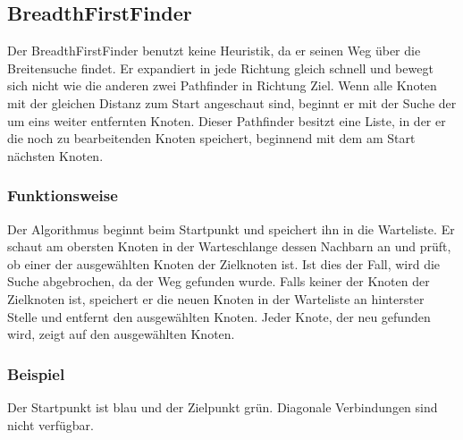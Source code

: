 \subsection{BreadthFirstFinder}

Der BreadthFirstFinder benutzt keine Heuristik, da er seinen Weg über die
Breitensuche findet. Er expandiert in jede Richtung gleich schnell und
bewegt sich nicht wie die anderen zwei Pathfinder in Richtung Ziel. Wenn
alle Knoten mit der gleichen Distanz zum Start angeschaut sind, beginnt
er mit der Suche der um eins weiter entfernten Knoten. Dieser Pathfinder
besitzt eine Liste, in der er die noch zu bearbeitenden Knoten speichert,
beginnend mit dem am Start nächsten Knoten.
\cite[Brilliant.org]{brilliantbfs}

\subsubsection{Funktionsweise}

Der Algorithmus beginnt beim Startpunkt und speichert ihn in die Warteliste. Er schaut am
obersten Knoten in der Warteschlange dessen Nachbarn an und prüft, ob
einer der ausgewählten Knoten der Zielknoten ist. Ist dies der Fall, wird
die Suche abgebrochen, da der Weg gefunden wurde. Falls keiner der
Knoten der Zielknoten ist, speichert er die neuen Knoten in der Warteliste
an hinterster Stelle und entfernt den ausgewählten Knoten. Jeder Knote,
der neu gefunden wird, zeigt auf den ausgewählten Knoten.

\subsubsection{Beispiel}

Der Startpunkt ist blau und der Zielpunkt grün. Diagonale Verbindungen sind nicht verfügbar.

